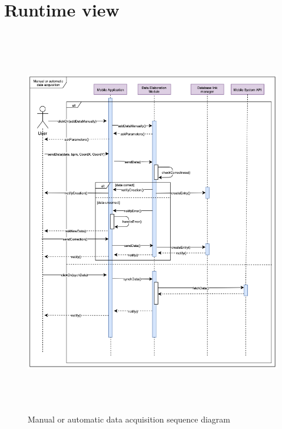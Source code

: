 \documentclass[DD.tex]{subfiles}
\begin{document}
\section{Runtime view}

\begin{figure}[h!]
\centering
\includegraphics[height=17.00cm,keepaspectratio]{Figures/DataAcquisition}
\caption{Manual or automatic data acquisition sequence diagram}
\end{figure}
\end{document}
